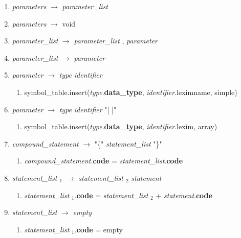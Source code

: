 \documentclass[12pt]{article}
\newcommand{\sub}[1]{$_{#1}$}
\begin{document}
\begin{enumerate}[label = \arabic*.]
\item \textit{ parameters } $\rightarrow$ \textit{ parameter\_list }

\item \textit{ parameters } $\rightarrow$ void

\item \textit{ parameter\_list } $\rightarrow$ \textit{ parameter\_list } , \textit{ parameter }

\item \textit{ parameter\_list } $\rightarrow$ \textit{ parameter}

\item \textit{ parameter } $\rightarrow$ \textit{ type } \textit{ identifier }
\begin{enumerate}[label = \roman*.]
\item symbol\_table.insert(\textit{type}.\textbf{data\_type}, \textit{identifier}.leximname, simple)
\end{enumerate}

\item \textit{ parameter } $\rightarrow$ \textit{ type } \textit{ identifier } "[ ]"
\begin{enumerate}[label = \roman*.]
\item symbol\_table.insert(\textit{type}.\textbf{data\_type}, \textit{identifier}.lexim, array)
\end{enumerate}

\item \textit{ compound\_statement } $\rightarrow$ "\{" \textit{ statement\_list } "\}"
\begin{enumerate}[label = \roman*.]
\item \textit{compound\_statement}.\textbf{code} = \textit{statement\_list}.\textbf{code}
\end{enumerate}

\item \textit{ statement\_list \sub{1} } $\rightarrow$ \textit{ statement\_list \sub{2}} \textit{ statement }
\begin{enumerate}[label = \roman*.]
\item \textit{statement\_list} \sub{1}.\textbf{code} = \textit{statement\_list} \sub{2} + \textit{statement}.\textbf{code}
\end{enumerate}

\item \textit{ statement\_list } $\rightarrow$ \textit{ empty }
\begin{enumerate}[label = \roman*.]
\item \textit{statement\_list} \sub{1}.\textbf{code} = empty
\end{enumerate}


\end{enumerate}
\end{document}
